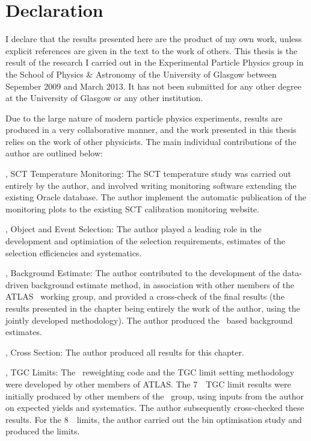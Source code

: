 \chapter*{Declaration}
I declare that the results presented here are the product of my own work, unless
explicit references are given in the text to the work of others. This thesis is
the result of the research I carried out in the Experimental Particle Physics
group in the School of Physics \& Astronomy of the University of Glasgow between
Sepember 2009 and March 2013. It has not been submitted for any other degree
at the University of Glasgow or any other institution.

Due to the large nature of modern particle physics experiments, results are produced in a very collaborative
manner, and the work presented in this thesis relies on the work of other
physicists. The main individual contributions of the author are outlined below:

, SCT Temperature Monitoring: The SCT temperature study was
carried out entirely by the author, and involved writing monitoring software
extending the existing Oracle database. The author implement the automatic
publication of the monitoring plots to the existing SCT calibration monitoring
website.

, Object and Event Selection: The author played a
leading role in the development and optimiation of the selection requirements,
estimates of the selection efficiencies and systematics.

, Background Estimate: The author contributed to the 
development of the data-driven background estimate method, in association with other members
of the ATLAS \ZZ\ working group, and provided a cross-check of the final
results (the results presented in the chapter being entirely the work of the
author, using the jointly developed methodology). The author produced the \mc\ based background estimates.

, Cross Section: The author produced all results for
this chapter.

, TGC Limits: The \AfterBurner\ reweighting code and the TGC
limit setting methodology were developed by other members of 
ATLAS. The 7~\tev\ TGC limit results were initially produced by
other members of the \ZZ\ group, using inputs from the author on expected
yields and systematics. The author subsequently cross-checked these results. For
the 8~\tev\ limits, the author carried out the bin optimisation study and
produced the limits.
